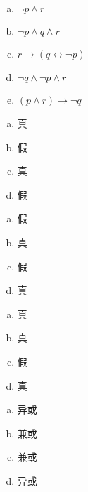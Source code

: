 {{        %
        \begin{practices}
            \begin{enumerate}[a)]
                \item $\neg p \wedge r$
                \item $\neg p \wedge q \wedge r$
                \item $r \rightarrow (q \leftrightarrow \neg p)$
                \item $\neg q \wedge \neg p \wedge r$
                \item $(p \wedge r) \rightarrow \neg q$
            \end{enumerate}
        \end{practices}

        \begin{practices}
            \begin{enumerate}[a)]
                \item 真
                \item 假
                \item 真
                \item 假
            \end{enumerate}
        \end{practices}

        \begin{practices}
            \begin{enumerate}[a)]
                \item 假
                \item 真
                \item 假
                \item 真
            \end{enumerate}
        \end{practices}

        \begin{practices}
            \begin{enumerate}[a)]
                \item 真
                \item 真
                \item 假
                \item 真
            \end{enumerate}
        \end{practices}

        \begin{practices}
            \begin{enumerate}[a)]
                \item 异或
                \item 兼或
                \item 兼或
                \item 异或
            \end{enumerate}
        \end{practices}

}}
